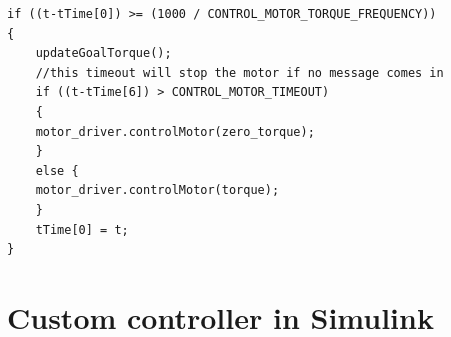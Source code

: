 \documentclass[12]{article}
\begin{document}
\begin{lstlisting}
if ((t-tTime[0]) >= (1000 / CONTROL_MOTOR_TORQUE_FREQUENCY))
{
    updateGoalTorque();
    //this timeout will stop the motor if no message comes in
    if ((t-tTime[6]) > CONTROL_MOTOR_TIMEOUT) 
    {
    motor_driver.controlMotor(zero_torque);
    } 
    else {
    motor_driver.controlMotor(torque);
    }
    tTime[0] = t;
}
\end{lstlisting}

\newpage

\section{Custom controller in Simulink}
\end{document}
